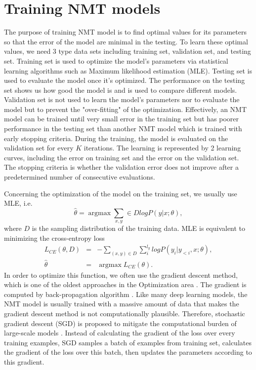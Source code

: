 \section{Training NMT models} \label{sec:train}
The purpose of training NMT model is to find optimal values for its parameters so that the error of the model are minimal in the testing. To learn these optimal values, we need 3 type data sets including training set, validation set, and testing set. Training set is used to optimize the model's parameters via statistical learning algorithms such as Maximum likelihood estimation (MLE)\citep{Baum87Supervised}. Testing set is used to evaluate the model once it's optimized. The performance on the testing set shows us how good the model is and is used to compare different models. Validation set is not used to learn the model's parameters nor to evaluate the model but to prevent the "over-fitting" of the optimization. Effectively, an NMT model can be trained until very small error in the training set but has poorer performance in the testing set than another NMT model which is trained with early stopping criteria. During the training, the model is evaluated on the validation set for every $K$ iterations. The learning is represented by 2 learning curves, including the error on training set and the error on the validation set. The stopping criteria is whether the validation error does not improve after a predetermined number of consecutive evaluations.

Concerning the optimization of the model on the training set, we usually use MLE, i.e.
\begin{equation}
\hat{\theta} = \displaystyle{\mathop{argmax}\mathop{\sum}_{x,y} \in \mathit{D}}log P(y|x;\theta),
\label{eq:mle}
\end{equation}
where $\mathit{D}$ is the sampling distribution of the training data.
MLE is equivalent to minimizing the cross-entropy loss
\begin{equation}
\begin{array}{rcl}
L_{CE}(\theta,\mathit{D}) &=& -\displaystyle{\mathop{\sum}_{(x,y) \in \mathit{D}} \mathop{\sum}_{i}^{l_y}}log P(y_i|y_{<i},x;\theta), \\
\hat{\theta} &=& \displaystyle{\mathop{argmax}} L_{CE}(\theta).
\end{array}
\end{equation}
In order to optimize this function, we often use the gradient descent method, which is one of the oldest approaches in the Optimization area \citep{Cauchy1847method}. The gradient is computed by back-propagation algorithm \citep{Rumelhart88learning}. Like many deep learning models, the NMT model is usually trained with a massive amount of data that makes the gradient descent method is not computationally plausible. Therefore, stochastic gradient descent (SGD) is proposed to mitigate the computational burden of large-scale models \citep{Herbert51stochastic,Kiefer52stochastic,Bottou10large}. Instead of calculating the gradient of the loss over every training examples, SGD samples a batch of examples from training set, calculates the gradient of the loss over this batch, then updates the parameters according to this gradient.

